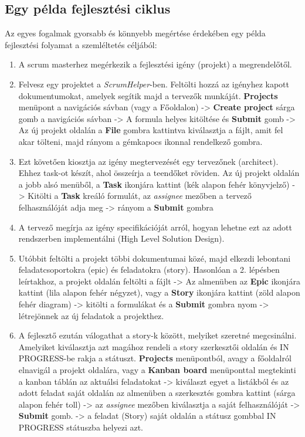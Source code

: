 \subsection{Egy példa fejlesztési ciklus}
\label{example_workflow}

Az egyes fogalmak gyorsabb és könnyebb megértése érdekében egy példa fejlesztési folyamat a szemléltetés céljából:

\begin{enumerate}
	\item A scrum masterhez megérkezik a fejlesztési igény (projekt) a megrendelőtől.
	\item Felvesz egy projektet a \textit{ScrumHelper}-ben. Feltölti hozzá az igényhez kapott dokumentumokat, amelyek segítik majd a tervezők munkáját. \textbf{Projects} menüpont a navigációs sávban (vagy a Főoldalon) -> \textbf{Create project} sárga gomb a navigációs sávban -> A formula helyes kitöltése és \textbf{Submit} gomb -> Az új projekt oldalán a \textbf{File} gombra kattintva kiválasztja a fájlt, amit fel akar tölteni, majd rányom a gémkapocs ikonnal rendelkező gombra.
	\item Ezt követően kiosztja az igény megtervezését egy tervezőnek (architect). Ehhez task-ot készít, ahol összeírja a teendőket röviden. Az új projekt oldalán a jobb alsó menüből, a \textbf{Task} ikonjára kattint (kék alapon fehér könyvjelző) -> Kitölti a \textbf{Task} kreáló formulát, az \textit{assignee} mezőben a tervező felhasználóját adja meg -> rányom a \textbf{Submit} gombra
	\item A tervező megírja az igény specifikációját arról, hogyan lehetne ezt az adott rendszerben implementálni (High Level Solution Design).
	\item Utóbbit feltölti a projekt többi dokumentumai közé, majd elkezdi lebontani feladatcsoportokra (epic) és feladatokra (story). Hasonlóan a 2. lépésben leírtakhoz, a projekt oldalán feltölti a fájlt -> Az almenüben az \textbf{Epic} ikonjára kattint (lila alapon fehér négyzet), vagy a \textbf{Story} ikonjára kattint (zöld alapon fehér diagram) -> kitölti a formulákat és a \textbf{Submit} gombra nyom -> létrejönnek az új feladatok a projekthez.
	\item A fejlesztő ezután válogathat a story-k között, melyiket szeretné megcsinálni. Amelyiket kiválasztja azt magához rendeli a story szerkesztői oldalán és IN PROGRESS-be rakja a státuszt. \textbf{Projects} menüpontból, avagy a főoldalról elnavigál a projekt oldalára, vagy a \textbf{Kanban board} menüponttal megtekinti a kanban táblán az aktuálsi feladatokat -> kiválaszt egyet a listákból és az adott feladat saját oldalán az almenüben a szerkesztés gombra kattint (sárga alapon fehér toll) -> az \textit{assignee} mezőben kiválasztja a saját felhasználóját -> \textbf{Submit} gomb. -> a feladat (Story) saját oldalán a státusz gombbal IN PROGRESS státuszba helyezi azt.

\end{enumerate}

